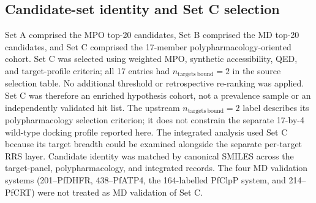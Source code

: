 \documentclass[11pt,a4paper]{article}
\begin{document}
	\subsection{Candidate-set identity and Set C selection}\label{sec:methods_cohort}
	Set A comprised the MPO top-20 candidates, Set B comprised the MD top-20 candidates, and Set C comprised the 17-member polypharmacology-oriented cohort. Set C was selected using weighted MPO, synthetic accessibility, QED, and target-profile criteria; all 17 entries had $n_{\mathrm{targets\ bound}}=2$ in the source selection table. No additional threshold or retrospective re-ranking was applied. Set C was therefore an enriched hypothesis cohort, not a prevalence sample or an independently validated hit list. The upstream $n_{\mathrm{targets\ bound}}=2$ label describes its polypharmacology selection criterion; it does not constrain the separate 17-by-4 wild-type docking profile reported here. The integrated analysis used Set C because its target breadth could be examined alongside the separate per-target RRS layer. Candidate identity was matched by canonical SMILES across the target-panel, polypharmacology, and integrated records. The four MD validation systems (201--PfDHFR, 438--PfATP4, the 164-labelled PfClpP system, and 214--PfCRT) were not treated as MD validation of Set C.
	
\end{document}

